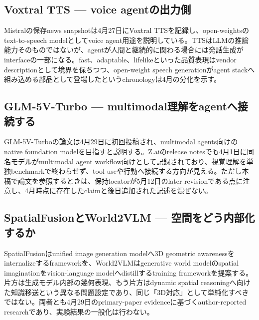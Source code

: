 \subsection{Voxtral TTS — voice agentの出力側}

Mistralの保存news snapshotは4月27日にVoxtral TTSを記録し、open-weightsのtext-to-speech modelとしてvoice agent用途を説明している。TTSはLLMの推論能力そのものではないが、agentが人間と継続的に関わる場合には発話生成がinterfaceの一部になる。fast、adaptable、lifelikeといった品質表現はvendor descriptionとして境界を保ちつつ、open-weight speech generationがagent stackへ組み込める部品として登場したというchronologyは4月の分化を示す。\autocite{src-d8b7c1c36830}


\subsection{GLM-5V-Turbo — multimodal理解をagentへ接続する}

GLM-5V-Turboの論文は4月29日に初回投稿され、multimodal agents向けのnative foundation modelを目指すと説明する。Z.aiのrelease notesでも4月1日に同名モデルがmultimodal agent workflow向けとして記録されており、視覚理解を単独benchmarkで終わらせず、tool useや行動へ接続する方向が見える。ただし本稿で論文を参照するときは、保持locatorが5月12日のlater revisionである点に注意し、4月時点に存在したclaimと後日追加された記述を混ぜない。\autocite{src-d113b486a585}


\subsection{SpatialFusionとWorld2VLM — 空間をどう内部化するか}

SpatialFusionはunified image generation modelへ3D geometric awarenessをinternalizeするframeworkを、World2VLMはgenerative world modelのspatial imaginationをvision-language modelへdistillするtraining frameworkを提案する。片方は生成モデル内部の幾何表現、もう片方はdynamic spatial reasoningへ向けた知識移送という異なる問題設定であり、同じ「3D対応」として単純化すべきではない。両者とも4月29日のprimary-paper evidenceに基づくauthor-reported researchであり、実験結果の一般化は行わない。\autocite{src-3fa7f7c1140f,src-fec81b98fdc8}


